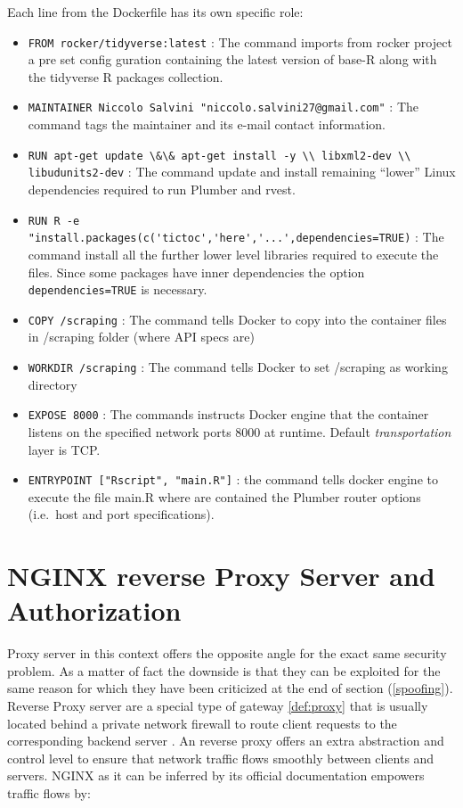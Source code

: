 \documentclass[
  12pt,
  a4paper,
  oneside]{book}
\newcommand{\passthrough}[1]{#1}
\theoremstyle{definition}
\theoremstyle{definition}
\theoremstyle{definition}
\theoremstyle{remark}
\begin{document}
Each line from the Dockerfile has its own specific role:

\begin{itemize}
\item
  \passthrough{\lstinline!FROM rocker/tidyverse:latest!} : The command imports from rocker project a pre set config guration containing the latest version of base-R along with the tidyverse \citep{tidyverse} R packages collection.
\item
  \passthrough{\lstinline!MAINTAINER Niccolo Salvini "niccolo.salvini27@gmail.com"!} : The command tags the maintainer and its e-mail contact information.
\item
  \passthrough{\lstinline!RUN apt-get update \&\& apt-get install -y \\ libxml2-dev \\ libudunits2-dev!} : The command update and install remaining ``lower'' Linux dependencies required to run Plumber and rvest.
\item
  \passthrough{\lstinline!RUN R -e "install.packages(c('tictoc','here','...',dependencies=TRUE)!} : The command install all the further lower level libraries required to execute the files. Since some packages have inner dependencies the option \passthrough{\lstinline!dependencies=TRUE!} is necessary.
\item
  \passthrough{\lstinline!COPY /scraping!} : The command tells Docker to copy into the container files in /scraping folder (where API specs are)
\item
  \passthrough{\lstinline!WORKDIR /scraping!} : The command tells Docker to set /scraping as working directory
\item
  \passthrough{\lstinline!EXPOSE 8000!} : The commands instructs Docker engine that the container listens on the specified network ports 8000 at runtime. Default \emph{transportation} layer is TCP.
\item
  \passthrough{\lstinline!ENTRYPOINT ["Rscript", "main.R"]!} : the command tells docker engine to execute the file main.R where are contained the Plumber router options (i.e.~host and port specifications).
\end{itemize}

\hypertarget{nginx}{%
\section{NGINX reverse Proxy Server and Authorization}\label{nginx}}

Proxy server in this context offers the opposite angle for the exact same security problem. As a matter of fact the downside is that they can be exploited for the same reason for which they have been criticized at the end of section (\ref{spoofing}). Reverse Proxy server are a special type of gateway \ref{def:proxy} that is usually located behind a private network firewall to route client requests to the corresponding backend server \citep{nginxDocs}. An reverse proxy offers an extra abstraction and control level to ensure that network traffic flows smoothly between clients and servers. NGINX as it can be inferred by its official documentation empowers traffic flows by:
\end{document}
